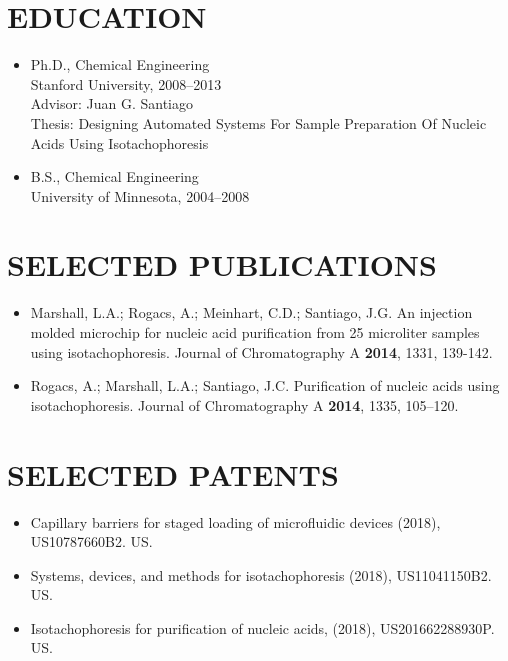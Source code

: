 \documentclass{res}
\begin{document}
\begin{resume}


\section{EDUCATION}
    \begin{itemize}
  		\item{Ph.D., Chemical Engineering}\\
		  Stanford University, 2008--2013 \\
  		Advisor: Juan G. Santiago\\
      Thesis: Designing Automated Systems For Sample Preparation Of Nucleic Acids Using Isotachophoresis
  	  \item{B.S., Chemical Engineering}\\
		  University of Minnesota, 2004--2008 \\
    \end{itemize}
      \vspace{-0.2in}

 \section{SELECTED PUBLICATIONS}
  \begin{itemize}
  \item Marshall, L.A.; Rogacs, A.; Meinhart, C.D.; Santiago, J.G. An injection molded microchip for nucleic acid purification from 25 microliter samples using isotachophoresis. Journal of Chromatography A \textbf{2014}, 1331, 139-142.
  \item Rogacs, A.; Marshall, L.A.; Santiago, J.C. Purification of nucleic acids using isotachophoresis. Journal of Chromatography A \textbf{2014}, 1335, 105–120.
\end{itemize}

 \section{SELECTED PATENTS}
   \begin{itemize}
    \item Capillary barriers for staged loading of microfluidic devices (2018), US10787660B2. US.  
    \item Systems, devices, and methods for isotachophoresis (2018), US11041150B2. US.
    \item Isotachophoresis for purification of nucleic acids, (2018), US201662288930P. US. 
   \end{itemize}



\end{resume}
\end{document}
